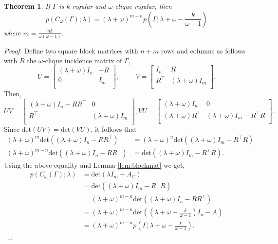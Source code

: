 \documentclass[10pt,a4paper]{amsart}
\newtheorem{thm}{Theorem}
\begin{document}
\begin{thm} \label{thm:eigen}
    If $\Gamma$ is $k$-regular and $\omega$-clique regular, then 
    \[p(C_\omega(\Gamma); \lambda)=(\lambda+\omega)^{m-n}p\left(\Gamma;\lambda+\omega-\frac{k}{\omega - 1}\right)\]
    where $m=\frac{nk}{\omega(\omega-1)}$.
\end{thm}

\begin{proof}
    Define two square block matrices with $n+m$ rows and columns as follows with $R$ the $\omega$-clique incidence matrix of $\Gamma$,
    \[U = \begin{bmatrix}(\lambda+\omega) I_n & -R \\0 & I_m \\\end{bmatrix}, \hspace{1cm}
    V = \begin{bmatrix}I_n & R \\R^\top  & (\lambda+\omega) I_m \\\end{bmatrix}.\]
Then, 
\[UV = \begin{bmatrix}(\lambda+\omega) I_n - RR^\top  & 0 \\R^\top  & (\lambda+\omega) I_m \\\end{bmatrix}, 
    VU = \begin{bmatrix}(\lambda+\omega) I_n & 0 \\(\lambda+\omega) R^\top  & (\lambda+\omega) I_m - R^\top R \\\end{bmatrix}.\]
Since $\text{det}(UV)=\text{det}(VU)$, it follows that
\begin{align*}
    (\lambda+\omega)^m \text{det}((\lambda+\omega) I_n - RR^\top ) & =(\lambda+\omega)^n \text{det}((\lambda+\omega) I_m - R^\top R) \\ 
    (\lambda+\omega)^{m-n} \text{det}((\lambda+\omega) I_n - RR^\top ) & =\text{det}((\lambda+\omega) I_m - R^\top R).
\end{align*}
Using the above equality and Lemma \ref{lem:blockmat} we get,
\begin{align*}
    p(C_\omega(\Gamma);\lambda) & = \text{det}(\lambda I_m - A_C) \\ 
    & = \text{det}((\lambda + \omega)I_m - R^\top R)  \\
    & = (\lambda + \omega)^{m-n}\text{det}((\lambda + \omega)I_n - RR^\top ) \\
    & = (\lambda + \omega)^{m-n}\text{det}\left(\left(\lambda + \omega - \frac{k}{\omega -1}\right)I_n - A\right)\\
    & = (\lambda + \omega)^{m-n}p\left(\Gamma ; \lambda + \omega - \frac{k}{\omega -1}\right).
\end{align*}
\end{proof}
\end{document}
